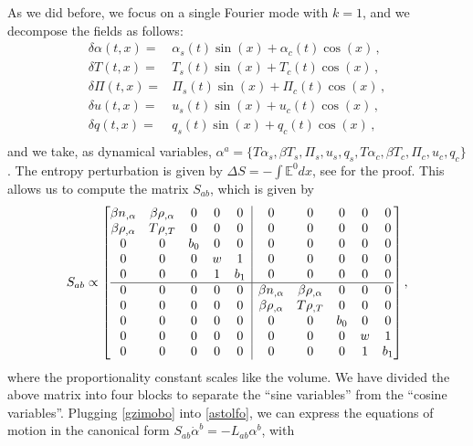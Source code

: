 \documentclass[a4paper, amsfonts, amssymb, amsmath, reprint, showkeys, nofootinbib, twoside, onecolumn,notitlepage]{revtex4-1}
\begin{document}
As we did before, we focus on a single Fourier mode with $k=1$, and we decompose the fields as follows:
\begin{equation}\label{gzimobo}
\begin{split}
 \delta \alpha(t,x)={}& \alpha_s(t)\sin(x)+\alpha_c(t) \cos(x) \, ,\\
 \delta T(t,x)={}&  T_s(t)\sin(x)+ T_c(t) \cos(x) \, ,\\
 \delta \Pi(t,x)={}&  \Pi_s(t)\sin(x)+ \Pi_c(t) \cos(x) \, ,\\
\delta u(t,x)={}&  u_s(t)\sin(x)+ u_c(t) \cos(x) \, ,\\
 \delta q(t,x)={}&  q_s(t)\sin(x)+ q_c(t) \cos(x) \, ,\\
\end{split}
\end{equation}
and we take, as dynamical variables, $\alpha^a=\{T\alpha_s,\beta T_s,\Pi_s,u_s,q_s,T\alpha_c,\beta T_c, \Pi_c,u_c,q_c \}$. The entropy perturbation is given by $\Delta S=-\int \mathbb{E}^0 dx$, see \cite{GavassinoGibbs2021} for the proof. This allows us to compute the matrix $S_{ab}$, which is given by
\begin{equation}
S_{ab} \propto 
\left[\begin{array}{@{}ccccc|ccccc@{}}
\beta n_{,\alpha} & \beta \rho_{,\alpha} & 0 & 0 & 0 & 0 & 0 & 0 & 0 & 0\\
\beta \rho_{,\alpha} & T\rho_{,T} & 0 & 0 & 0 & 0 & 0 & 0 & 0 & 0 \\
0 & 0 & b_0 & 0 & 0 & 0 & 0 & 0 & 0 & 0 \\
0 & 0 & 0  & w & 1 & 0 & 0 & 0 & 0 & 0 \\
0 & 0 & 0 & 1 & b_1 & 0 & 0 & 0 & 0 & 0 \\ \hline
0&0&0&0&0&\beta n_{,\alpha} & \beta \rho_{,\alpha} & 0 & 0 & 0 \\
0&0&0&0&0&\beta \rho_{,\alpha} & T\rho_{,T} & 0 & 0 & 0 \\
0&0&0&0&0&0 & 0 & b_0 & 0 & 0 \\
0&0&0&0&0&0 & 0 & 0  & w & 1 \\
0&0&0&0&0&0 & 0 & 0 & 1 & b_1 \\
\end{array}\right] ,
\end{equation}
where the proportionality constant scales like the volume. We have divided the above matrix into four blocks to separate the ``sine variables'' from the ``cosine variables''. Plugging \eqref{gzimobo} into \eqref{astolfo}, we can express the equations of motion in the canonical form $S_{ab}\dot{\alpha}^b=-L_{ab}\alpha^b$, with
\end{document}

